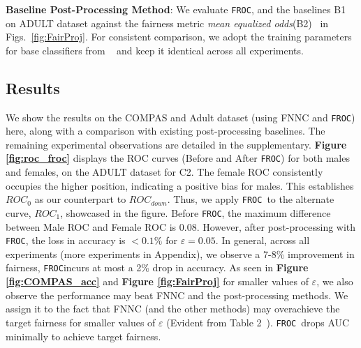 \documentclass{article}
\newcommand{\av}[1]{ \textcolor{blue}{{\bf AV: }{``\em #1''}}}
\newcommand{\ouralgo}{\texttt{FROC}}
\begin{document}
\noindent \textbf{Baseline Post-Processing Method}: We evaluate \ouralgo, and the baselines B1 on ADULT dataset against the fairness metric \emph{mean equalized odds}(B2)~\cite{alghamdi2022}  in Figs.~\ref{fig:FairProj}.
For consistent comparison, we adopt the training parameters for base classifiers from ~\cite{alghamdi2022} and keep it identical across all experiments.


\subsection{Results}
We show the results on the COMPAS and Adult dataset (using FNNC and \ouralgo) here, along with a comparison with existing post-processing baselines.
The remaining experimental observations are detailed in the supplementary.
%
\textbf{Figure \ref{fig:roc_froc}} displays the ROC curves (Before and After \ouralgo) for both males and females, on the ADULT dataset for C2. The female ROC consistently occupies the higher position, indicating a positive bias for males. This establishes $ROC_{0}$ as our counterpart to $ROC_{down}$. Thus, we apply \ouralgo\ to the alternate curve, $ROC_{1}$, showcased in the figure. Before \ouralgo, the maximum difference between Male ROC and Female ROC is $0.08$. However, after post-processing with \ouralgo, the loss in accuracy is $<0.1\%$ for $\varepsilon=0.05$. 
In general, across all experiments (more experiments in Appendix), we observe a 7-8\% improvement in fairness, \ouralgo incurs at most a 2\% drop in accuracy. As seen in \textbf{Figure \ref{fig:COMPAS_acc}} and \textbf{Figure \ref{fig:FairProj}} for smaller values of $\varepsilon$, we also observe the performance may beat FNNC and the post-processing methods.
We assign it to the fact that FNNC (and the other methods) may overachieve the target fairness for smaller values of $\varepsilon$ (Evident from Table 2~\cite{padala21}). \ouralgo\ drops AUC minimally to achieve target fairness. 
\end{document}
